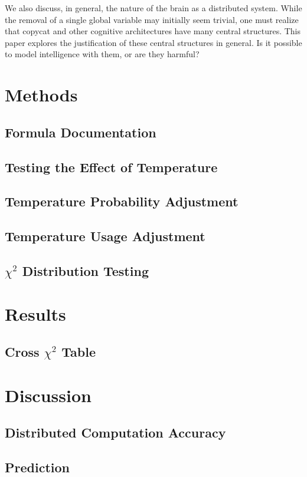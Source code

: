 \documentclass[a4paper]{article}
\begin{document}
    We also discuss, in general, the nature of the brain as a distributed system.
    While the removal of a single global variable may initially seem trivial, one must realize that copycat and other cognitive architectures have many central structures.
    This paper explores the justification of these central structures in general.
    Is it possible to model intelligence with them, or are they harmful?


\section{Methods}
    \subsection{Formula Documentation}
    \subsection{Testing the Effect of Temperature}
    \subsection{Temperature Probability Adjustment}
    \subsection{Temperature Usage Adjustment}
    \subsection{$\chi^2$ Distribution Testing}
\section{Results}
    \subsection{Cross $\chi^2$ Table}
\section{Discussion}
    \subsection{Distributed Computation Accuracy}
    \subsection{Prediction}



\end{document}
